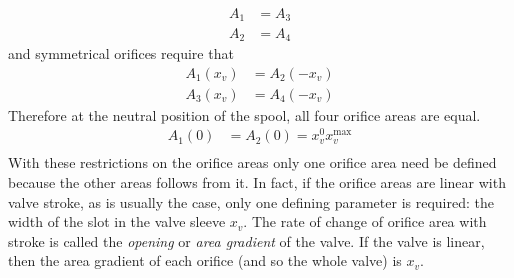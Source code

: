\documentclass[12pt,a4paper,oneside]{book}
\begin{document}
\begin{onehalfspace}
\begin{equation}
	\begin{aligned}
		A_1 &= A_3 \\[6pt]
		A_2 &= A_4
	\end{aligned}
\end{equation}
and symmetrical orifices require that
\begin{equation}
	\begin{aligned}
		A_1(x_v) &= A_2(-x_v) \\[6pt]
		A_3(x_v) &= A_4(-x_v)
	\end{aligned}
\end{equation}
Therefore at the neutral position of the spool, all four orifice areas are equal.
\begin{equation}
	\begin{aligned}
		A_1(0) &= A_2(0) = x_v^0x_v^{\text{max}} \\[6pt]
	\end{aligned}
\end{equation}
With these restrictions on the orifice areas only one orifice area need be defined because the other areas follows from it. In fact, if the orifice areas are linear with valve stroke, as is usually the case, only one defining parameter is required: the width of the slot in the valve sleeve $x_v$. The rate of change of orifice area with stroke is called the \textit{opening} or \textit{area gradient} of the valve. If the valve is linear, then  the area gradient of each orifice (and so the whole valve) is $x_v$.
 



\end{onehalfspace}
\end{document}
